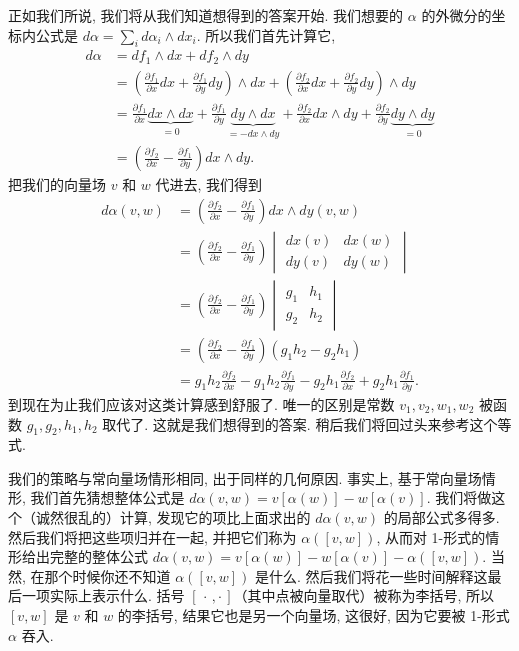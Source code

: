 正如我们所说, 我们将从我们知道想得到的答案开始. 我们想要的 $\alpha$ 的外微分的坐标内公式是 $d\alpha=\sum_i d\alpha_i\wedge dx_i$. 所以我们首先计算它, 
\begin{align*}
d\alpha&=df_1\wedge dx+df_2\wedge dy\\
&=\left(\frac{\partial f_1}{\partial x}dx+\frac{\partial f_1}{\partial y}dy\right)\wedge dx
+\left(\frac{\partial f_2}{\partial x}dx+\frac{\partial f_2}{\partial y}dy\right)\wedge dy\\
&=\frac{\partial f_1}{\partial x}\underbrace{dx\wedge dx}_{=0}+\frac{\partial f_1}{\partial y}\underbrace{dy\wedge dx}_{=-dx\wedge dy}
+\frac{\partial f_2}{\partial x}dx\wedge dy+\frac{\partial f_2}{\partial y}\underbrace{dy\wedge dy}_{=0}\\
&=\left(\frac{\partial f_2}{\partial x}-\frac{\partial f_1}{\partial y}\right)dx\wedge dy.
\end{align*}
把我们的向量场 $v$ 和 $w$ 代进去, 我们得到
\begin{align*}
d\alpha(v,w)&=\left(\frac{\partial f_2}{\partial x}-\frac{\partial f_1}{\partial y}\right)dx\wedge dy(v,w)\\
&=\left(\frac{\partial f_2}{\partial x}-\frac{\partial f_1}{\partial y}\right)
\begin{vmatrix}dx(v)&dx(w)\\dy(v)&dy(w)\end{vmatrix}\\
&=\left(\frac{\partial f_2}{\partial x}-\frac{\partial f_1}{\partial y}\right)
\begin{vmatrix}g_1&h_1\\g_2&h_2\end{vmatrix}\\
&=\left(\frac{\partial f_2}{\partial x}-\frac{\partial f_1}{\partial y}\right)(g_1h_2-g_2h_1)\\
&=g_1h_2\frac{\partial f_2}{\partial x}-g_1h_2\frac{\partial f_1}{\partial y}
-g_2h_1\frac{\partial f_2}{\partial x}+g_2h_1\frac{\partial f_1}{\partial y}.
\end{align*}
到现在为止我们应该对这类计算感到舒服了. 唯一的区别是常数 $v_1,v_2,w_1,w_2$ 被函数 $g_1,g_2,h_1,h_2$ 取代了. 这就是我们想得到的答案. 稍后我们将回过头来参考这个等式.

我们的策略与常向量场情形相同, 出于同样的几何原因. 事实上, 基于常向量场情形, 我们首先猜想整体公式是 $d\alpha(v,w)=v[\alpha(w)]-w[\alpha(v)]$. 我们将做这个（诚然很乱的）计算, 发现它的项比上面求出的 $d\alpha(v,w)$ 的局部公式多得多. 然后我们将把这些项归并在一起, 并把它们称为 $\alpha([v,w])$, 从而对 1-形式的情形给出完整的整体公式 $d\alpha(v,w)=v[\alpha(w)]-w[\alpha(v)]-\alpha([v,w])$. 当然, 在那个时候你还不知道 $\alpha([v,w])$ 是什么. 然后我们将花一些时间解释这最后一项实际上表示什么. 括号 $[\,\cdot\,,\cdot\,]$（其中点被向量取代）被称为李括号, 所以 $[v,w]$ 是 $v$ 和 $w$ 的李括号, 结果它也是另一个向量场, 这很好, 因为它要被 1-形式 $\alpha$ 吞入.


